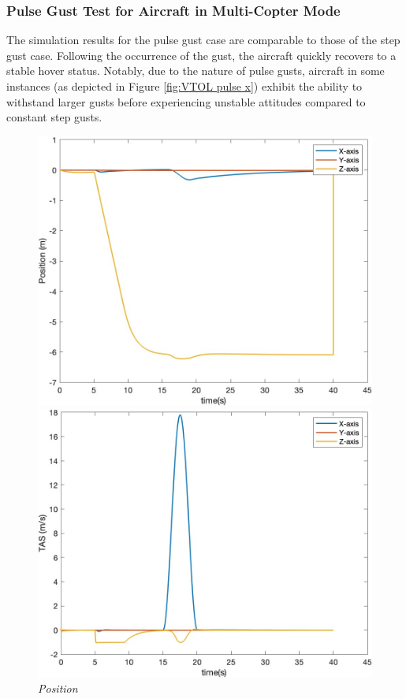 \subsubsection{Pulse Gust Test for Aircraft in Multi-Copter Mode}

The simulation results for the pulse gust case are comparable to those of the step gust case. Following the occurrence of the gust, the aircraft quickly recovers to a stable hover status. Notably, due to the nature of pulse gusts, aircraft in some instances (as depicted in Figure \ref{fig:VTOL pulse x}) exhibit the ability to withstand larger gusts before experiencing unstable attitudes compared to constant step gusts.

\begin{figure}[htbp]
  \centering
  \begin{minipage}[b]{0.45\textwidth}
    \centering
    \includegraphics[width=\textwidth]{Images/Gust/VTOL pulse/1 position_1.jpg}
    \caption*{\textit{Position}}
  \end{minipage}
  \hfil
  \begin{minipage}[b]{0.45\textwidth}
    \centering
    \includegraphics[width=\textwidth]{Images/Gust/VTOL pulse/2 airspeed_1.jpg}

\end{minipage}
\end{figure}
